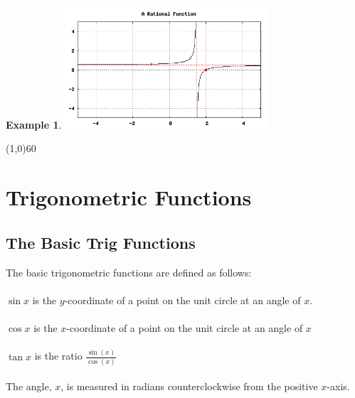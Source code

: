 \documentclass[10.5pt,twoside]{report}
\theoremstyle{definition}
\newtheorem{exmp}{Example}[section]
\begin{document}
\begin{exmp}
\includegraphics[width=3in]{example_1_1_2_2}



\end{exmp}
\line(1,0){60}
\linethickness{0.5mm}
\pagebreak

\section{Trigonometric Functions}\label{Trigonometric Functions}

\subsection{The Basic Trig Functions}

The basic trigonometric functions are defined as follows:\\
${}$\\
\hspace{4ex} $\sin{x}$ is the $y$-coordinate of a point on the unit circle at an angle of $x$.\\
${}$\\
  
\hspace{4ex} $\cos{x}$ is the $x$-coordinate of a point on the unit circle at an angle of $x$\\
${}$\\
  
\hspace{4ex} $\tan{x}$ is the ratio $\displaystyle \frac{\sin(x)}{\cos(x)}$\\
${}$\\
The angle, $x$, is measured in radians counterclockwise from the positive $x$-axis.
\end{document}
